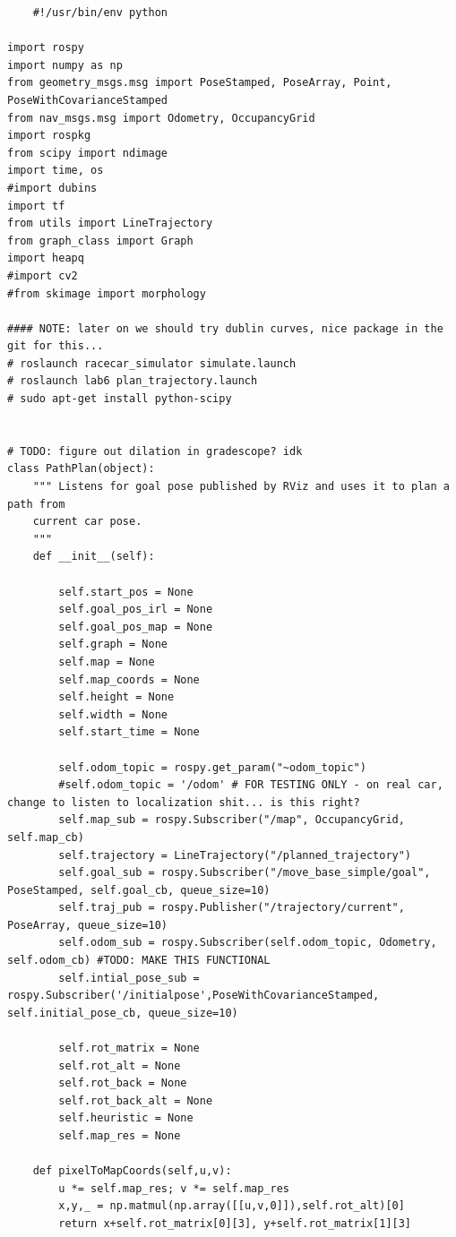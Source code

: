 \documentclass{article}
\begin{document}
{\footnotesize
\begin{verbatim}
    #!/usr/bin/env python

import rospy
import numpy as np
from geometry_msgs.msg import PoseStamped, PoseArray, Point, PoseWithCovarianceStamped
from nav_msgs.msg import Odometry, OccupancyGrid
import rospkg
from scipy import ndimage
import time, os
#import dubins
import tf
from utils import LineTrajectory
from graph_class import Graph
import heapq
#import cv2 
#from skimage import morphology

#### NOTE: later on we should try dublin curves, nice package in the git for this...
# roslaunch racecar_simulator simulate.launch
# roslaunch lab6 plan_trajectory.launch
# sudo apt-get install python-scipy


# TODO: figure out dilation in gradescope? idk
class PathPlan(object):
    """ Listens for goal pose published by RViz and uses it to plan a path from
    current car pose.
    """
    def __init__(self):

        self.start_pos = None
        self.goal_pos_irl = None
        self.goal_pos_map = None
        self.graph = None
        self.map = None
        self.map_coords = None
        self.height = None
        self.width = None
        self.start_time = None

        self.odom_topic = rospy.get_param("~odom_topic")
        #self.odom_topic = '/odom' # FOR TESTING ONLY - on real car, change to listen to localization shit... is this right?
        self.map_sub = rospy.Subscriber("/map", OccupancyGrid, self.map_cb)
        self.trajectory = LineTrajectory("/planned_trajectory")
        self.goal_sub = rospy.Subscriber("/move_base_simple/goal", PoseStamped, self.goal_cb, queue_size=10)
        self.traj_pub = rospy.Publisher("/trajectory/current", PoseArray, queue_size=10)
        self.odom_sub = rospy.Subscriber(self.odom_topic, Odometry, self.odom_cb) #TODO: MAKE THIS FUNCTIONAL
        self.intial_pose_sub = rospy.Subscriber('/initialpose',PoseWithCovarianceStamped, self.initial_pose_cb, queue_size=10)

        self.rot_matrix = None
        self.rot_alt = None
        self.rot_back = None
        self.rot_back_alt = None
        self.heuristic = None
        self.map_res = None

    def pixelToMapCoords(self,u,v):
        u *= self.map_res; v *= self.map_res
        x,y,_ = np.matmul(np.array([[u,v,0]]),self.rot_alt)[0]
        return x+self.rot_matrix[0][3], y+self.rot_matrix[1][3]
    

\end{verbatim}}
\end{document}
